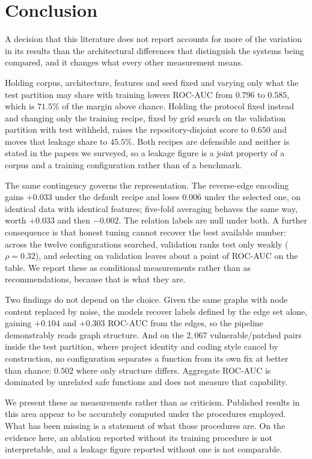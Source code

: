 \section{Conclusion}
A decision that this literature does not report accounts for more of the
variation in its results than the architectural differences that distinguish
the systems being compared, and it changes what every other measurement means.

Holding corpus, architecture, features and seed fixed and varying only what the
test partition may share with training lowers ROC-AUC from $0.796$ to $0.585$,
which is $71.5\%$ of the margin above chance. Holding the protocol fixed instead
and changing only the training recipe, fixed by grid search on the validation
partition with test withheld, raises the repository-disjoint score to $0.650$
and moves that leakage share to $45.5\%$. Both recipes are defensible and
neither is stated in the papers we surveyed, so a leakage figure is a joint
property of a corpus and a training configuration rather than of a benchmark.

The same contingency governs the representation. The reverse-edge encoding gains $+0.033$ under the default recipe and
loses $0.006$ under the selected one, on identical data with identical features;
five-fold averaging behaves the same way, worth $+0.033$ and then $-0.002$. The
relation labels are null under both. A further consequence is that honest
tuning cannot recover the best available number: across the twelve
configurations searched, validation ranks test only weakly ($\rho=0.32$), and
selecting on validation leaves about a point of ROC-AUC on the table. We report
these as conditional measurements rather than as recommendations, because that
is what they are.

Two findings do not depend on the choice. Given the same graphs with node
content replaced by noise, the models recover labels defined by the edge set
alone, gaining $+0.104$ and $+0.303$ ROC-AUC from the edges, so the pipeline
demonstrably reads graph structure. And on the $2{,}067$ vulnerable/patched
pairs inside the test partition, where project identity and coding style cancel
by construction, no configuration separates a function from its own fix at
better than chance: $0.502$ where only structure differs. Aggregate ROC-AUC is
dominated by unrelated safe functions and does not measure that capability.

We present these as measurements rather than as criticism. Published results in
this area appear to be accurately computed under the procedures employed. What
has been missing is a statement of what those procedures are. On the evidence
here, an ablation reported without its training procedure is not interpretable,
and a leakage figure reported without one is not comparable.
